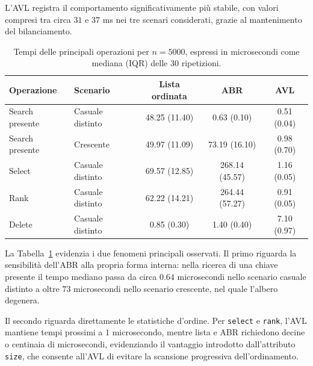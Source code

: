 \documentclass[a4paper,11pt]{article}
\begin{document}
L'AVL registra il comportamento significativamente più stabile, con valori compresi tra circa $31$ e $37$ ms nei tre scenari considerati, grazie al mantenimento del bilanciamento.

\begin{table}[H]
    \centering
    \small

    \begin{tabular}{llccc}
        \toprule
        Operazione
        & Scenario
        & Lista ordinata
        & ABR
        & AVL \\
        \midrule

        Search presente
        & Casuale distinto
        & 48.25 (11.40)
        & 0.63 (0.10)
        & 0.51 (0.04) \\

        Search presente
        & Crescente
        & 49.97 (11.09)
        & 73.19 (16.10)
        & 0.98 (0.70) \\

        Select
        & Casuale distinto
        & 69.57 (12.85)
        & 268.14 (45.57)
        & 1.16 (0.05) \\

        Rank
        & Casuale distinto
        & 62.22 (14.21)
        & 264.44 (57.27)
        & 0.91 (0.05) \\

        Delete
        & Casuale distinto
        & 0.85 (0.30)
        & 1.40 (0.40)
        & 7.10 (0.97) \\

        \bottomrule
    \end{tabular}
    \caption{Tempi delle principali operazioni per $n=5000$, espressi in microsecondi come mediana (IQR) delle 30 ripetizioni.}
    \label{tab:confronto-operazioni-5000}
\end{table}

La Tabella~\ref{tab:confronto-operazioni-5000} evidenzia i due fenomeni principali osservati. Il primo riguarda la sensibilità dell'ABR alla propria forma interna: nella ricerca di una chiave presente il tempo mediano passa da circa $0.64$ microsecondi nello scenario casuale distinto a oltre $73$ microsecondi nello scenario crescente, nel quale l'albero degenera.

Il secondo riguarda direttamente le statistiche d'ordine. Per \texttt{select} e \texttt{rank}, l'AVL mantiene tempi prossimi a $1$ microsecondo, mentre lista e ABR richiedono decine o centinaia di microsecondi, evidenziando il vantaggio introdotto dall'attributo \texttt{size}, che consente all'AVL di evitare la scansione progressiva dell'ordinamento.
\end{document}
